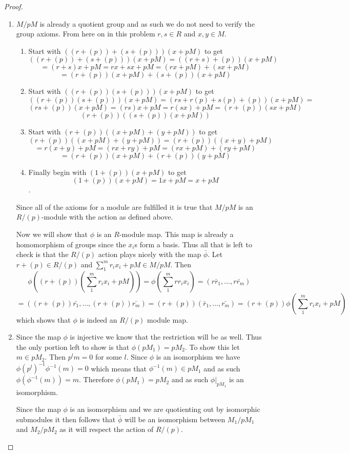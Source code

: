 \documentclass[10pt]{article}
\theoremstyle{plain}
\theoremstyle{remark}
\begin{document}
\begin{proof}
  \begin{enumerate}
  \item $M/pM$ is already a quotient group and as such we do not need to verify
    the group axioms. From here on in this problem $r,s\in R$ and $x,y\in M$.
    \begin{enumerate}
    \item Start with $((r+(p))+(s+(p)))(x+pM)$ to get
      \[((r+(p))+(s+(p)))(x+pM)=((r+s)+(p))(x+pM)\]
      \[=(r+s)x+pM=rx+sx+pM=(rx+pM)+(sx+pM) \]
      \[=(r+(p))(x+pM)+(s+(p))(x+pM) \]
    \item Start with $((r+(p))(s+(p)))(x+pM)$ to get
      \[((r+(p))(s+(p)))(x+pM)=(rs+r(p)+s(p)+(p))(x+pM)=\]
      \[(rs+(p))(x+pM)=(rs)x+pM=r(sx)+pM=(r+(p))(sx+pM) \]
      \[(r+(p))((s+(p))(x+pM)) \]
    \item Start with $(r+(p))((x+pM)+(y+pM))$ to get
      \[(r+(p))((x+pM)+(y+pM))=(r+(p))((x+y)+pM)\]
      \[=r(x+y)+pM=(rx+ry)+pM=(rx+pM)+(ry+pM)\]
      \[=(r+(p))(x+pM)+(r+(p))(y+pM)\]
    \item Finally begin with $(1+(p))(x+pM)$ to get
      \[(1+(p))(x+pM)=1x+pM=x+pM \].
    \end{enumerate}
    Since all of the axioms for a module are fulfilled it is true that
    $M/pM$ is an $R/(p)$-module with the action as defined above.

    Now we will show that $\phi$ is an $R$-module map. This map is already a
    homomorphism of groups since the $x_i$s form a basis. Thus all that is left
    to check is that the $R/(p)$ action plays nicely with the map $\bar{\phi}$.
    Let $r+(p)\in R/(p)$ and $\sum_1^mr_ix_i+pM\in M/pM$. Then
    \[\phi((r+(p))(\sum_1^mr_ix_i+pM))=\phi(\sum_1^mrr_ix_i)=(\bar{rr_1},\ldots,\bar{rr_m})\]
    \[=((r+(p))\bar{r_1},\ldots,(r+(p))\bar{r_m})=(r+(p))(\bar{r}_1,\ldots,\bar{r_m})
      =(r+(p))\phi(\sum_1^mr_ix_i+pM)\]
    which shows that $\phi$ is indeed an $R/(p)$ module map.
  \item Since the map $\phi$ is injective we know that the restriction will be as
    well. Thus the only portion left to show is that $\phi(pM_1)=pM_2$. To show
    this let $m\in pM_2$. Then $p^lm=0$ for some $l$. Since $\phi$ is an isomorphism
    we have $\phi(p^l)^{-1}\phi^{-1}(m)=0$ which means that $\phi^{-1}(m)\in pM_1$ and as such
    $\phi(\phi^{-1}(m))=m$. Therefore $\phi(pM_1)=pM_2$ and as such $\phi|_{pM_1}$ is an
    isomorphism.

    Since the map $\phi$ is an isomorphism and we are quotienting out by isomorphic
    submodules it then follows that $\bar{\phi}$ will be an isomorphism between
    $M_1/pM_1$ and $M_2/pM_2$ as it will respect the action of $R/(p)$.
  \end{enumerate}
\end{proof}
\end{document}
